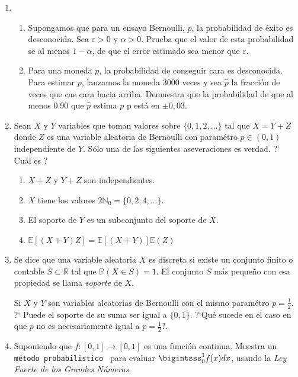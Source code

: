 \documentclass[a4paper,11pt]{report}
\begin{document}
\begin{enumerate}
\begin{enumerate}
\end{enumerate}
\item
\begin{enumerate}
\item Supongamos que para un ensayo Bernoulli, $p$, la probabilidad de \'exito es desconocida. Sea $\varepsilon >0 $ y $\alpha >0 $. Prueba que el valor de esta probabilidad se al menos $1 - \alpha$, de que el error estimado sea menor que $\varepsilon$.
\item Para una moneda $p$, la probabilidad de conseguir cara  es desconocida. Para estimar $p$,  lanzamos la moneda $3000$ veces y sea $\hat{p}$  la fracci\'on de veces que cae cara hacia arriba. Demuestra  que la probabilidad  de que al menos $0.90$ que  $\hat{p}$ estima  $p$ p est\'a en $\pm 0,03$.
\end{enumerate}


\item Sean $X$ y $Y$ variables que toman valores sobre $\{0, 1, 2, \dots \}$ tal que $X = Y + Z$ donde $Z$ es una variable aleatoria de Bernoulli con param\'etro $p \in (0, 1)$ independiente de $Y$. S\'olo una de las siguientes aseveraciones es verdad. ?` Cu\'al es ?

\begin{enumerate}
	\item $X + Z$ y $Y + Z$ son independientes.
	\item $X$ tiene los valores $2\mathbb{N}_{0} = \{ 0, 2, 4, \dots\}$.
	\item El soporte de $Y$ es un subconjunto del soporte de $X$.
	\item $\mathbb{E}[( X+ Y)Z] = \mathbb{E}[(X +Y)]\mathbb{E}(Z)$
\end{enumerate}
\item Se dice que una variable aleatoria $X$ es discreta si existe un conjunto finito o contable $S \subset \mathbb{R}$ tal que $\mathbb{P}(X \in S)  = 1$. El conjunto $S$ m\'as peque\~no con esa propiedad se llama \textit{soporte } de $X$.

Si $X$ y $Y$ son variables aleatorias de Bernoulli con el mismo param\'etro $p = \frac{1}{2}$. ?` Puede el soporte de su suma ser igual a $\{0, 1\}$. ?`Qu\'e sucede  en el caso en que $p$ no es necesariamente  igual a $p = \frac{1}{2}$?.


\item Suponiendo que $f:[0,1] \rightarrow [0,1]$ es una funci\'on continua. Muestra un \texttt{m\'etodo probabilistico } para evaluar $\bigintsss_{0}^{1}f(x) dx$, usando la \textit{Ley Fuerte de los Grandes N\'umeros}.


\end{enumerate}
\end{document}
